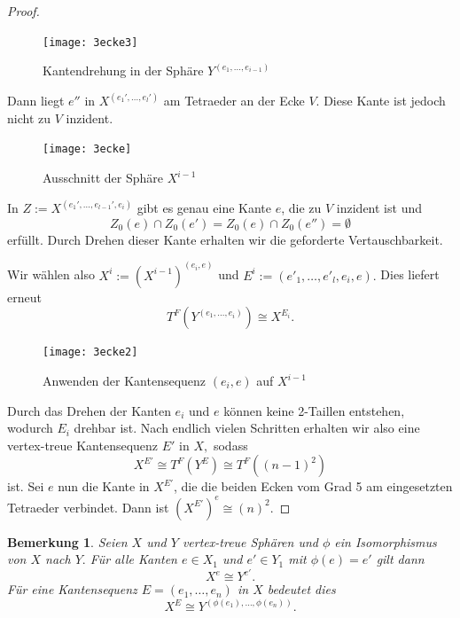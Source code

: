 \documentclass[12pt,titlepage,twoside,cleardoublepage]{article}
\theoremstyle{nummermitklammern}
\newtheorem{bemerkung}[temp]{Bemerkung}
\newtheorem{bemerkung}[zahl]{Bemerkung}
\numberwithin{equation}{section}
\begin{document}
\begin{proof}
\begin{itemize}
\begin{figure}[H]
\begin{center}
\texttt{[image: 3ecke3]}
\end{center}
\caption{Kantendrehung in der Sphäre $Y^{(e_1,\ldots,e_{i-1})}$}
\end{figure}
Dann liegt $e''$ in $X^{(e_1',\ldots,e_l')}$ am Tetraeder an der Ecke $V.$ Diese Kante ist jedoch nicht zu $V$ inzident.  
\begin{figure}[H]
\begin{center}
\texttt{[image: 3ecke]}
\end{center}
\caption{Ausschnitt der Sphäre $X^{i-1}$}
\end{figure}
In $Z:=X^{(e_1',\ldots,e_{l-1}',e_i)}$ gibt es genau eine Kante $e$, die zu $V$ inzident ist und 
 \[
Z_0(e)\cap Z_0(e')=Z_0(e)\cap Z_0(e'')=\emptyset
\]
erfüllt. Durch Drehen dieser Kante erhalten wir die geforderte Vertauschbarkeit.

Wir wählen also $X^{i}:={(X^{i-1})}^{(e_i,e)}$ und $E^{i}:=(e'_1,\ldots,e'_l,e_i,e).$ Dies liefert erneut
\[
T^F(Y^{(e_1,\ldots,e_i)})\cong X^{E_{i}}.
\] 
\begin{figure}[H]
\begin{center}
\texttt{[image: 3ecke2]}
\end{center}
\caption{Anwenden der Kantensequenz $(e_i,e)$ auf $X^{i-1}$}
\end{figure}
\end{itemize}
 Durch das Drehen der Kanten $e_i$ und $e$ können keine 2-Taillen entstehen, wodurch $E_{i}$ drehbar ist.
Nach endlich vielen Schritten erhalten wir also eine vertex-treue Kantensequenz $E'$ in $X,$ sodass 
\[X^{E'}\cong T^F(Y^E) \cong T^F((n-1)^2)
\]ist.
Sei $e$ nun die Kante in $X^{E'}$, die die beiden Ecken vom Grad 5 am eingesetzten Tetraeder verbindet. Dann ist $(X^{E'})^e\cong (n)^2.$
\end{proof}
\begin{bemerkung}
Seien $X$ und $Y$ vertex-treue Sphären und $\phi$ ein Isomorphismus von $X$ nach $Y.$ Für alle Kanten $e\in X_1$ und $e'\in Y_1$ mit $\phi(e)=e'$ gilt dann
\[ 
X^e \cong Y^{e'} .
\]
Für eine Kantensequenz $E=(e_1,\ldots,e_n)$ in $X$ bedeutet dies 
\[
X^E\cong Y^{(\phi(e_1),\ldots,\phi(e_n))}.
\]
\end{bemerkung}
\end{document}
